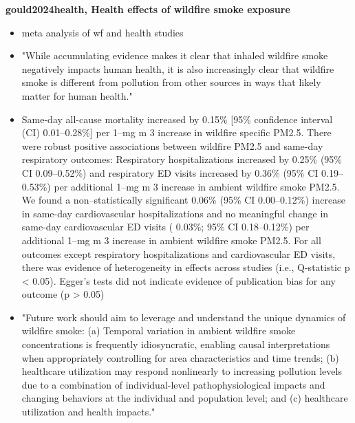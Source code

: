 \textbf{gould2024health, Health effects of wildfire smoke exposure}
\begin{itemize}
    \item meta analysis of wf and health studies
    \item "While accumulating evidence makes it clear that inhaled wildfire smoke negatively impacts human health, it is also increasingly clear that wildfire smoke is different from pollution from other sources in ways that likely matter for human health."
    \item Same-day all-cause mortality increased by 0.15\% [95\% confidence interval (CI) 0.01–0.28\%] per 1–mg m 3 increase in wildfire specific PM2.5. There were robust positive associations between wildfire PM2.5 and same-day respiratory outcomes: Respiratory hospitalizations increased by 0.25\% (95\% CI 0.09–0.52\%) and respiratory ED visits increased by 0.36\% (95\% CI 0.19–0.53\%) per additional 1–mg m 3 increase in ambient wildfire smoke PM2.5. We found a non–statistically significant 0.06\% (95\% CI 0.00–0.12\%) increase in same-day cardiovascular hospitalizations and no meaningful change in same-day cardiovascular ED visits ( 0.03\%; 95\% CI 0.18–0.12\%) per additional 1–mg m 3 increase in ambient wildfire smoke PM2.5. For all outcomes except respiratory hospitalizations and cardiovascular ED visits, there was evidence of heterogeneity in effects across studies (i.e., Q-statistic p < 0.05). Egger’s tests did not indicate evidence of publication bias for any outcome (p > 0.05)
    \item "Future work should aim to leverage and understand the unique dynamics of wildfire smoke: (a) Temporal variation in ambient wildfire smoke concentrations is frequently idiosyncratic, enabling causal interpretations when appropriately controlling for area characteristics and time trends; (b) healthcare utilization may respond nonlinearly to increasing pollution levels due to a combination of individual-level pathophysiological impacts and changing behaviors at the individual and population level; and (c) healthcare utilization and health impacts."
\end{itemize}

